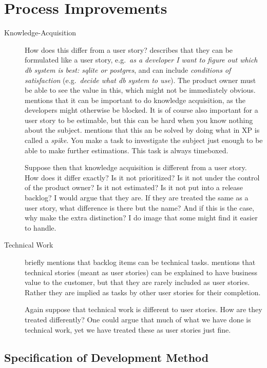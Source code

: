 \chapter{Process Improvements}
\begin{description}
  \item[Knowledge-Acquisition] 
  How does this differ from a user story? \cite{rubin2012essential} describes that they can be formulated like a user story, e.g.\ \emph{as a developer I want to figure out which db system is best: sqlite or postgres}, and can include \emph{conditions of satisfaction} (e.g.\ \emph{decide what db system to use}). The product owner must be able to see the value in this, which might not be immediately obvious. \cite{rubin2012essential} mentions that it can be important to do knowledge acquisition, as the developers might otherwise be blocked. It is of course also important for a user story to be estimable, but this can be hard when you know nothing about the subject. \cite{cohn2004} mentions that this an be solved by doing what in XP is called a \emph{spike}. You make a task to investigate the subject just enough to be able to make further estimations. This task is always timeboxed.

  Suppose then that knowledge acquisition is different from a user story. How does it differ exactly? Is it not prioritized? Is it not under the control of the product owner? Is it not estimated? Is it not put into a release backlog? I would argue that they are. If they are treated the same as a user story, what difference is there but the name? And if this is the case, why make the extra distinction? I do image that some might find it easier to handle.
  \item[Technical Work] 
  \cite[The Product Backlog]{cohn2004} briefly mentions that backlog items can be technical tasks. \cite[pp. 90--91]{rubin2012essential} mentions that technical stories (meant as user stories) can be explained to have business value to the customer, but that they are rarely included as user stories. Rather they are implied as tasks by other user stories for their completion.

  Again suppose that technical work is different to user stories. How are they treated differently? One could argue that much of what we have done is technical work, yet we have treated these as user stories just fine.
\end{description}

\section{Specification of Development Method}
\dummy

